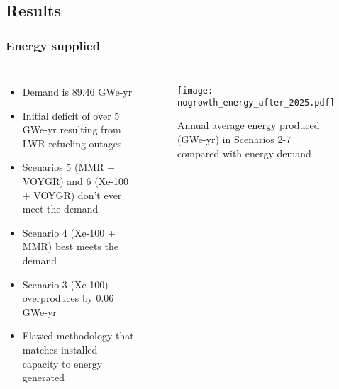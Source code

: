 \subsection{Results}
\begin{frame}
    \frametitle{Energy supplied}
    \begin{columns}
        \column[t]{4.8cm}
            \begin{itemize}
                \item Demand is 89.46 GWe-yr
                \item Initial deficit of over 5 GWe-yr resulting from \gls{LWR} 
                      refueling outages
                \item Scenarios 5 (MMR + VOYGR) and 6 (Xe-100 + VOYGR) don't 
                      ever meet the demand
                \item Scenario 4 (Xe-100 + MMR) best meets the demand
                \item Scenario 3 (Xe-100) overproduces by 0.06 GWe-yr  
                \item Flawed methodology that matches installed capacity 
                      to energy generated
                
            \end{itemize}
        \column[t]{5.5cm}
        \vspace{-0.8cm}
            \begin{figure}
                \centering
                \texttt{[image: nogrowth\_energy\_after\_2025.pdf]}
                \caption{Annual average energy produced (GWe-yr) in Scenarios 
                2-7 compared with energy demand}
                \label{fig:energy}

        \end{figure}
    \end{columns}
\end{frame}

